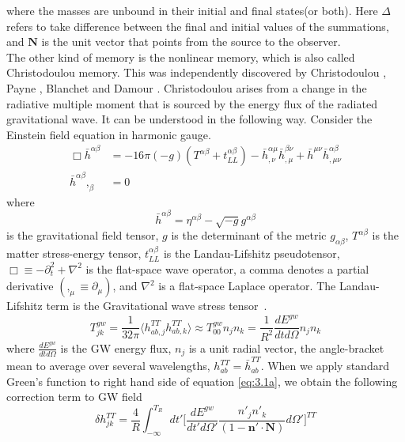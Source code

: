\documentclass[prd,preprintnumbers,twocolumn,eqsecnum,floatfix,letter]{revtex4}
\begin{document}
where the masses are unbound in their initial and final states(or both). Here $\Delta$ refers to take difference between the final and initial values of the summations, and $\boldsymbol{N}$ is the unit vector that points from the source to the observer.  
\\
The other kind of memory is the nonlinear memory, which is also called Christodoulou memory. This was independently discovered by Christodoulou \cite{Christodoulou1991}, Payne \cite{Payne1894}, Blanchet and Damour \cite{Blanchet_Damour1992}. Christodoulou arises from a change in the radiative multiple moment that is sourced by the energy flux of the radiated gravitational wave. It can be understood in the following way. Consider the Einstein field equation in harmonic gauge. \cite{Thorne1980} 
\begin{subequations}
\begin{align}\label{eq:3.1a}	
\Box \bar{h}^{\alpha \beta} & = -16\pi (-g)(T^{\alpha\beta} + t_{LL}^{\alpha\beta})-\bar{h}^{\alpha\mu}_{,\nu}\bar{h}^{\beta\nu}_{,\mu}+\bar{h}^{\mu\nu}\bar{h}^{\alpha\beta}_{,\mu\nu}\\
\bar{h}^{\alpha \beta},_{\beta} & = 0
\end{align}
\end{subequations}
where
\begin{equation}
\bar{h}^{\alpha \beta} = \eta^{\alpha\beta}-\sqrt{-g}g^{\alpha\beta} 
\end{equation}
is the gravitational field tensor, $g$ is the determinant of the metric $g_{\alpha\beta}$, $T^{\alpha\beta}$ is the matter stress-energy tensor, $t^{\alpha\beta}_{LL}$ is the Landau-Lifshitz pseudotensor, $\Box \equiv  -\partial^{2}_{t} + \nabla^{2}$ is the flat-space wave operator, a comma denotes a partial derivative $(,_{\mu}\equiv \partial_{\mu})$, and $\nabla^{2}$ is a flat-space Laplace operator. The Landau-Lifshitz term is the Gravitational wave stress tensor~\cite{Isaacson1968}.
\begin{equation}
	T^{gw}_{jk}=\frac{1}{32\pi}\langle h^{TT}_{ab,j}h^{TT}_{ab,k}\rangle\approx T^{gw}_{00}n_{j}n_{k} = \frac{1}{R^{2}}\frac{dE^{gw}}{dt d\Omega}n_{j}n_{k}
\end{equation}
where $\frac{dE^{gw}}{dtd\Omega}$ is the GW energy flux, $n_{j}$ is a unit radial vector, the angle-bracket mean to average over several wavelengths, $h^{TT}_{ab}=\bar{h}^{TT}_{ab}$. When we apply standard Green's function to right hand side of equation \ref{eq:3.1a}, we obtain the following correction term to GW field \cite{Wiseman1991}
\begin{equation}\label{eq:1.6}
	\delta h^{TT}_{jk} = \frac{4}{R}\int_{-\infty}^{T_{R}} dt'\Bigg[ \frac{dE^{gw}}{dt'd\Omega'}\frac{n'_{j}n'_{k}}{(1-\boldsymbol{n'}\cdot\boldsymbol{N})}d\Omega'\Bigg]^{TT}
\end{equation}
\end{document}
